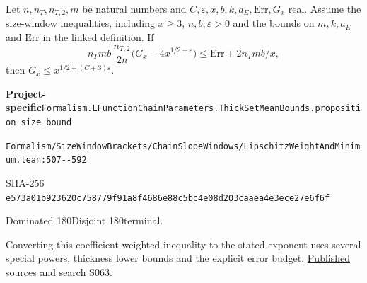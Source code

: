 
\begin{formalstatement}[D563]\label{decomp:D563}
Let $n,n_T,n_{T,2},m$ be natural numbers and $C,\varepsilon,x,b,k,a_E,\mathrm{Err},G_x$ real. Assume the size-window inequalities, including $x\geq3$, $n,b,\varepsilon>0$ and the bounds on $m,k,a_E$ and $\mathrm{Err}$ in the linked definition. If
        \[ n_T mb\,\frac{n_{T,2}}{2n}\bigl(G_x-4x^{1/2+\varepsilon}\bigr)
        \leq \mathrm{Err}+2n_T mb/x,\]
        then $G_x\leq x^{1/2+(C+3)\varepsilon}$.
\end{formalstatement}
{\small\raggedright\noindent\textsf{\bfseries Project-specific}\quad \nolinkurl{Formalism.LFunctionChainParameters.ThickSetMeanBounds.proposition_size_bound}\par\noindent \nolinkurl{Formalism/SizeWindowBrackets/ChainSlopeWindows/LipschitzWeightAndMinimum.lean:507--592}\par\noindent SHA-256 \nolinkurl{e573a01b923620c758779f91a8f4686e88c5bc4e08d203caaea4e3ece27e6f6f}\par\noindent Dominated 180\quad Disjoint 180\quad terminal.\par}
Converting this coefficient-weighted inequality to the stated exponent uses several special powers, thickness lower bounds and the explicit error budget.
\hyperref[lit:S063]{Published sources and search S063}.
